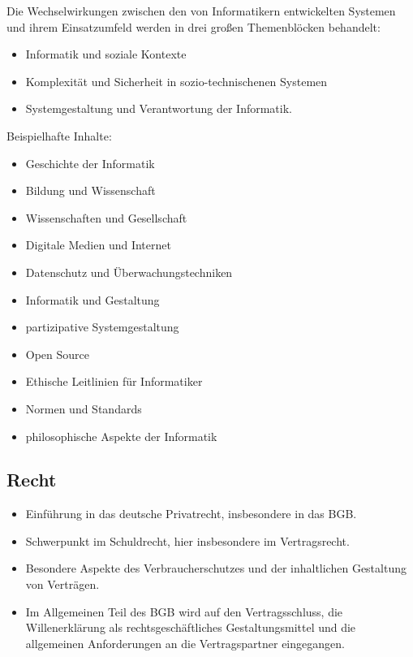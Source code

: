 Die Wechselwirkungen zwischen den von Informatikern entwickelten
Systemen und ihrem Einsatzumfeld werden in drei großen Themenblöcken
behandelt:

\begin{itemize}
\tightlist
\item
  Informatik und soziale Kontexte
\item
  Komplexität und Sicherheit in sozio-technischenen Systemen
\item
  Systemgestaltung und Verantwortung der Informatik.
\end{itemize}

Beispielhafte Inhalte:

\begin{itemize}
\tightlist
\item
  Geschichte der Informatik
\item
  Bildung und Wissenschaft
\item
  Wissenschaften und Gesellschaft
\item
  Digitale Medien und Internet
\item
  Datenschutz und Überwachungstechniken
\item
  Informatik und Gestaltung
\item
  partizipative Systemgestaltung
\item
  Open Source
\item
  Ethische Leitlinien für Informatiker
\item
  Normen und Standards
\item
  philosophische Aspekte der Informatik
\end{itemize}

\hypertarget{rechtpathlabelmi-2017modulbeschreibungen-bachelorba_mug}{%
\subsection*{Recht\label{/mi-2017/modulbeschreibungen-bachelor/BA_MUG}}\label{rechtpathlabelmi-2017modulbeschreibungen-bachelorba_mug}}

\begin{itemize}
\tightlist
\item
  Einführung in das deutsche Privatrecht, insbesondere in das BGB.
\item
  Schwerpunkt im Schuldrecht, hier insbesondere im Vertragsrecht.
\item
  Besondere Aspekte des Verbraucherschutzes und der inhaltlichen
  Gestaltung von Verträgen.
\item
  Im Allgemeinen Teil des BGB wird auf den Vertragsschluss, die
  Willenerklärung als rechtsgeschäftliches Gestaltungsmittel und die
  allgemeinen Anforderungen an die Vertragspartner eingegangen.
\end{itemize}


